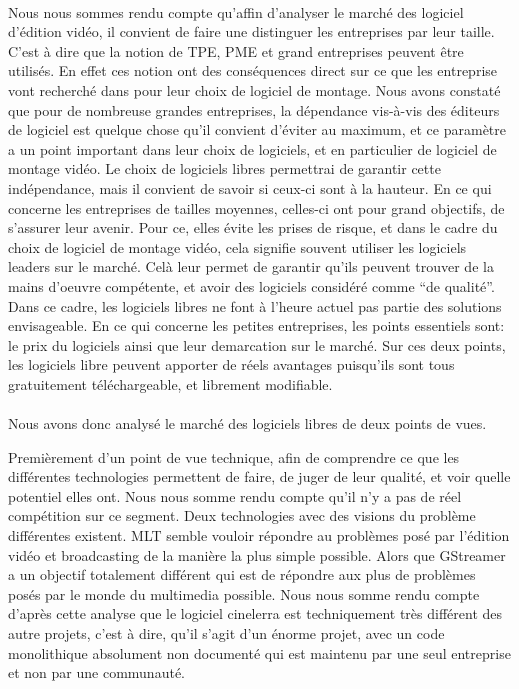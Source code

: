 \paragraph{}

Nous nous sommes rendu compte qu'affin d'analyser le marché des
logiciel d'édition vidéo, il convient  de faire une distinguer les
entreprises par leur taille. C'est à dire que la notion de TPE, PME
et grand entreprises peuvent être utilisés. En effet ces notion ont
des conséquences direct sur ce que les entreprise vont recherché dans
pour leur choix de logiciel de montage.  Nous avons constaté que pour de
nombreuse  grandes entreprises, la dépendance vis-à-vis des éditeurs
de logiciel est quelque chose qu'il convient d'éviter au maximum, et
ce paramètre a un point important dans leur choix de logiciels, et en
particulier de logiciel de montage vidéo. Le choix de logiciels libres
permettrai de garantir cette indépendance, mais il convient de savoir
si ceux-ci sont à la hauteur. En ce qui concerne les entreprises de
tailles moyennes, celles-ci ont pour grand objectifs, de s'assurer leur
avenir. Pour ce, elles évite les prises de risque, et dans le cadre du
choix de logiciel de montage vidéo, cela signifie souvent utiliser les
logiciels leaders sur le marché. Celà leur permet de garantir qu'ils
peuvent trouver de la mains d'oeuvre compétente, et avoir des logiciels
considéré comme ``de qualité''. Dans ce cadre, les logiciels libres ne
font à l'heure actuel pas partie des solutions envisageable. En ce qui
concerne les petites entreprises, les points essentiels sont: le prix du
logiciels ainsi que leur demarcation sur le marché. Sur ces deux points,
les logiciels libre peuvent apporter de réels avantages puisqu'ils sont
tous gratuitement téléchargeable, et librement modifiable.


\paragraph{}

Nous avons donc analysé le marché des logiciels libres de deux points
de vues.

Premièrement d'un point de vue technique, afin de comprendre ce que les
différentes technologies permettent de faire, de juger de leur qualité,
et voir quelle potentiel elles ont. Nous nous somme rendu compte qu'il
n'y a pas de réel compétition sur ce segment. Deux technologies avec des
visions du problème différentes existent. MLT semble vouloir répondre
au problèmes posé par l'édition vidéo et broadcasting de la manière
la plus simple possible. Alors que GStreamer a un objectif totalement
différent qui est de répondre aux plus de problèmes posés par le monde
du multimedia possible.  Nous nous somme rendu compte d'après cette
analyse que le logiciel cinelerra est techniquement très différent
des autre projets, c'est à dire, qu'il s'agit d'un énorme projet,
avec un code monolithique absolument non documenté
qui est maintenu par une seul entreprise et non par une communauté.

